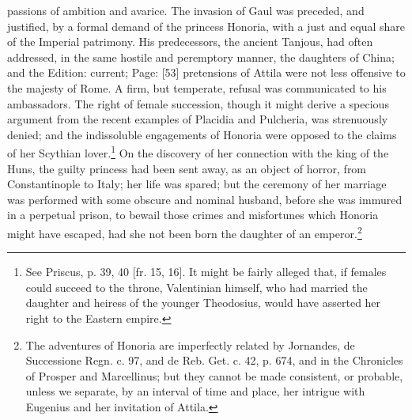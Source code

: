 passions of ambition and avarice. The invasion of Gaul was preceded, and justified, by a formal demand of the princess Honoria, with a just and equal share of the Imperial patrimony. His predecessors, the ancient Tanjous, had often addressed, in the same hostile and peremptory manner, the daughters of China; and the Edition: current; Page: [53] pretensions of Attila were not less offensive to the majesty of Rome. A firm, but temperate, refusal was communicated to his ambassadors. The right of female succession, though it might derive a specious argument from the recent examples of Placidia and Pulcheria, was strenuously denied; and the indissoluble engagements of Honoria were opposed to the claims of her Scythian lover.\footnote{See Priscus, p. 39, 40 [fr. 15, 16]. It might be fairly alleged that, if females could succeed to the throne, Valentinian himself, who had married the daughter and heiress of the younger Theodosius, would have asserted her right to the Eastern empire.} On the discovery of her connection with the king of the Huns, the guilty princess had been sent away, as an object of horror, from Constantinople to Italy; her life was spared; but the ceremony of her marriage was performed with some obscure and nominal husband, before she was immured in a perpetual prison, to bewail those crimes and misfortunes which Honoria might have escaped, had she not been born the daughter of an emperor.\footnote{The adventures of Honoria are imperfectly related by Jornandes, de Successione Regn. c. 97, and de Reb. Get. c. 42, p. 674, and in the Chronicles of Prosper and Marcellinus; but they cannot be made consistent, or probable, unless we separate, by an interval of time and place, her intrigue with Eugenius and her invitation of Attila.}

